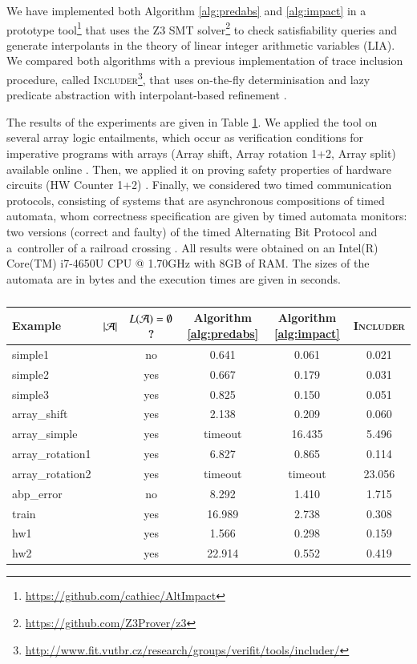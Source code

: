 \documentclass[10pt,conference,letterpaper,twocolumn]{IEEEtran}
\begin{document}
We have implemented both Algorithm \ref{alg:predabs} and
\ref{alg:impact} in a prototype
tool\footnote{\url{https://github.com/cathiec/AltImpact}} that uses
the Z3 SMT solver\footnote{\url{https://github.com/Z3Prover/z3}} to
check satisfiability queries and generate interpolants in the theory
of linear integer arithmetic variables (LIA). We compared both
algorithms with a previous implementation of trace inclusion
procedure, called
\textsc{Includer}\footnote{\url{http://www.fit.vutbr.cz/research/groups/verifit/tools/includer/}},
that uses on-the-fly determinisation and lazy predicate abstraction
with interpolant-based refinement \cite{Tacas16}.

The results of the experiments are given in Table
\ref{tab:experiments}. We applied the tool on several array logic
entailments, which occur as verification conditions for imperative
programs with arrays \cite{cav09} (Array shift, Array rotation 1+2,
Array split) available online \cite{ntslib}. Then, we applied it on
proving safety properties of hardware circuits (HW Counter 1+2)
\cite{smrcka}. Finally, we considered two timed communication
protocols, consisting of systems that are asynchronous compositions of
timed automata, whom correctness specification are given by timed
automata monitors: two versions (correct and faulty) of the timed
Alternating Bit Protocol \cite{abp} and a~controller of a railroad
crossing \cite{henzinger:RealTimeSystems}. All results were obtained
on an Intel(R) Core(TM) i7-4650U CPU @ 1.70GHz with 8GB of RAM. The
sizes of the automata are in bytes and the execution times are given
in seconds.

\begin{table}[htb]
\begin{center}
{\fontsize{8}{9}\selectfont
\begin{tabular}{||l|c|c|c|c|c||}
\hline
Example & ${|{\mathcal{A}}|}$ & $L(\mathcal{A})=\emptyset$ ? & Algorithm \ref{alg:predabs} & Algorithm \ref{alg:impact} & \textsc{Includer} \\
\hline
simple1 & & no & 0.641 & 0.061 & 0.021\\
\hline
simple2 & & yes & 0.667 & 0.179 & 0.031\\
\hline
simple3 & & yes & 0.825 & 0.150 & 0.051\\
\hline
array_shift & & yes & 2.138 & 0.209 & 0.060\\
\hline
array_simple & & yes & timeout & 16.435 & 5.496\\
\hline
array_rotation1 & & yes & 6.827 & 0.865 & 0.114\\
\hline
array_rotation2 & & yes & timeout & timeout & 23.056\\
\hline
abp_error & & no & 8.292 & 1.410 & 1.715\\
\hline
train & & yes & 16.989 & 2.738 & 0.308\\
\hline
hw1 & & yes & 1.566 & 0.298 & 0.159\\
\hline
hw2 & & yes & 22.914 & 0.552 & 0.419\\
\hline
\end{tabular}
}
\caption{}\label{tab:experiments}
\end{center}
\end{table}
\end{document}
